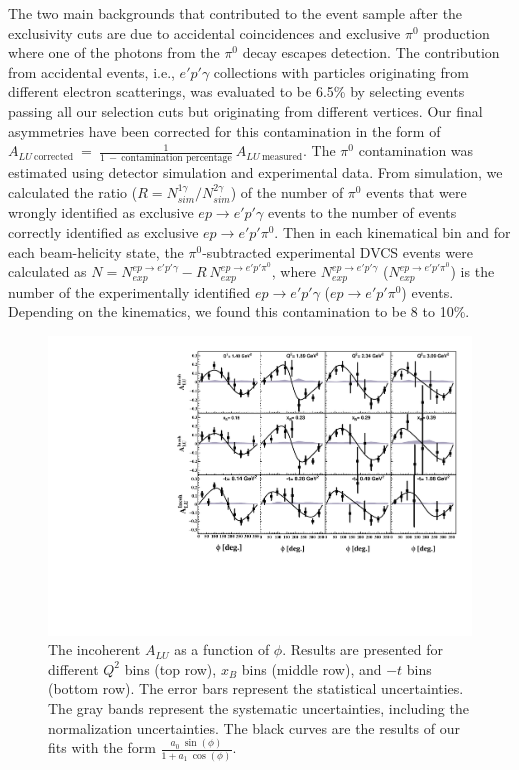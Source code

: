 \documentclass[twocolumn,nofootinbib,showpacs,prl,superscriptaddress,secnumarabic,amssymb,nobibnotes,aps,floatfix]{revtex4}
\begin{document}
The two main backgrounds that contributed to the event sample after the 
exclusivity cuts are due to accidental coincidences and exclusive $\pi^0$ 
production where one of the photons from the $\pi^0$ decay escapes detection.  
The contribution from accidental events, i.e., $e'p'\gamma$ collections with 
particles originating from different electron scatterings, was evaluated to be 
6.5\% by selecting events passing all our selection cuts but originating from 
different vertices. Our final asymmetries have been corrected for this 
contamination in the form of
$A_{LU~\text{corrected}}~=~\frac{1}{1~-~\text{contamination~percentage}}~A_{LU~\text{measured}}$. 
The $\pi^0$ contamination was estimated using detector simulation and 
experimental data. From simulation, we calculated the ratio ($R = 
N^{1\gamma}_{sim}/N^{2\gamma}_{sim}$) of the number of $\pi^0$ events that were 
wrongly identified as exclusive $ep\rightarrow e'p'\gamma$ events to the number 
of events correctly identified as exclusive $ep\rightarrow e'p'\pi^0$.  Then in 
each kinematical bin and for each beam-helicity state, the $\pi^0$-subtracted 
experimental DVCS events were calculated as $N = N^{ep\rightarrow 
e'p'\gamma}_{exp}- R~N^{ep\rightarrow e'p'\pi^0}_{exp}$, where 
$N^{ep\rightarrow e'p'\gamma}_{exp}$ ($N^{ep\rightarrow e'p'\pi^0}_{exp}$) is 
the number of the experimentally identified $ep\rightarrow e'p'\gamma$ 
($ep\rightarrow e'p'\pi^0$) events.  Depending on the kinematics, we found this 
contamination to be 8 to 10\%. 


\begin{figure}[t!]
\includegraphics[width=13.9cm]{figs/incoherent_ALU_phi.pdf}
\caption{The incoherent $A_{LU}$ as a function of $\phi$. Results are presented
   for different $Q^{2}$ bins (top row), $x_{B}$ bins (middle row), and $-t$ 
   bins (bottom row). The error bars represent the statistical uncertainties.  
   The gray bands represent the systematic uncertainties, including the 
   normalization uncertainties. The black curves are the results of our fits 
   with the form $\frac{a_{0}~\sin(\phi)}{1+ a_{1}~\cos(\phi)}$.}
\label{fig:alu}
\end{figure}
\end{document}
